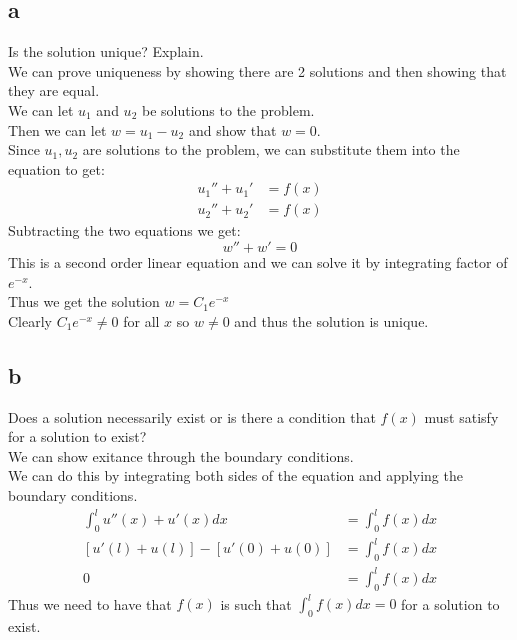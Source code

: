 \documentclass{article}
\begin{document}
\subsection*{a} Is the solution unique? Explain.\\
We can prove uniqueness by showing there are 2 solutions and then showing that they are equal.\\
We can let $u_1$ and $u_2$ be solutions to the problem.\\
Then we can let $w = u_1 - u_2$ and show that $w = 0$.\\
Since $u_1, u_2$ are solutions to the problem, we can substitute them into the equation to get:
\begin{align*}
    u_1'' + u_1' &= f(x)\\
    u_2'' + u_2' &= f(x)
\end{align*}
Subtracting the two equations we get:
$$ w'' + w' = 0$$
This is a second order linear equation and we can solve it by integrating factor of $e^{-x}.$\\
Thus we get the solution $w = C_1e^{-x}$\\
Clearly $C_1e^{-x} \neq 0$ for all $x$ so $w \neq 0$ and thus the solution is unique.\\

\subsection*{b} Does a solution necessarily exist or is there a condition that $f(x)$ must satisfy for a solution to exist?\\
We can show exitance through the boundary conditions.\\
We can do this by integrating both sides of the equation and applying the boundary conditions.\\
\begin{align*}
    \int_0^l u''(x) + u'(x) dx &= \int_0^l f(x) dx\\
    [u'(l) + u(l)] - [u'(0) + u(0)] &= \int_0^l f(x) dx\\
    0 &= \int_0^l f(x) dx
\end{align*}
Thus we need to have that $f(x)$ is such that $\int_0^l f(x) dx = 0$ for a solution to exist.\\
\end{document}
